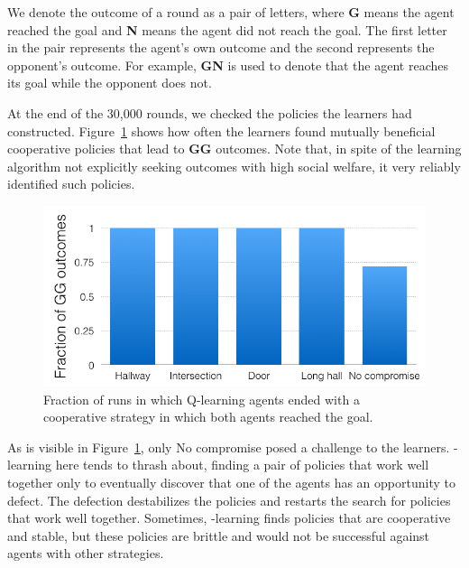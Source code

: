 \documentclass[letterpaper]{article}
\begin{document}

We denote the outcome of a round as a pair of letters, where {\bf G}
means the agent reached the goal and {\bf N} means the agent did not
reach the goal. The first letter in the pair represents the agent's
own outcome and the second represents the opponent's outcome. For
example, {\bf GN} is used to denote that the agent reaches its goal
while the opponent does not.

At the end of the 30,000 rounds, we checked the policies the learners
had constructed. Figure~\ref{f:coop} shows how often the learners
found mutually beneficial cooperative policies that lead to {\bf GG}
outcomes. Note that, in spite of the learning algorithm not explicitly
seeking outcomes with high social welfare, it very reliably identified
such policies.

\begin{figure}
\centering
\includegraphics[width=0.9\columnwidth]{figures/coop.png}
\caption{Fraction of runs in which Q-learning agents ended with a cooperative
strategy in which both agents reached the goal.}
\label{f:coop}
\end{figure}

As is visible in Figure~\ref{f:coop}, only No compromise posed a
challenge to the learners. \Q-learning here tends to thrash about,
finding a pair of policies that work well together only to eventually
discover that one of the agents has an opportunity to defect. The
defection destabilizes the policies and restarts the search for
policies that work well together. Sometimes, \Q-learning finds
policies that are cooperative and stable, but these policies are
brittle and would not be successful against agents with other
strategies.
\end{document}

